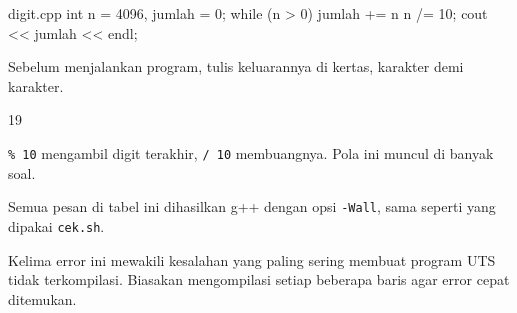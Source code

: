 \documentclass[a4paper]{article}
\begin{document}
\begin{MKode}{digit.cpp}
int n = 4096, jumlah = 0;
while (n > 0) {
    jumlah += n %
    n /= 10;
}
cout << jumlah << endl;
\end{MKode}
\begin{Tebak}[]
Sebelum menjalankan program, tulis keluarannya di kertas, karakter demi karakter.
\end{Tebak}
\begin{Jawaban}[]
\begin{MKeluaran}[]
19
\end{MKeluaran}
\texttt{\% 10} mengambil digit terakhir, \texttt{/ 10} membuangnya. Pola ini muncul di banyak soal.
\end{Jawaban}
Semua pesan di tabel ini dihasilkan g++ dengan opsi \texttt{-Wall}, sama seperti yang dipakai \texttt{cek.sh}.
\par\vspace{4pt}\par\vspace{6pt}
Kelima error ini mewakili kesalahan yang paling sering membuat program UTS tidak terkompilasi. Biasakan mengompilasi setiap beberapa baris agar error cepat ditemukan.
\end{document}
